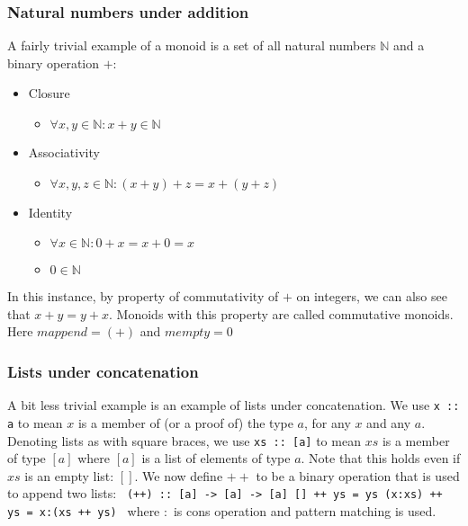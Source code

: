 \documentclass{acm_proc_article-sp}
\begin{document}
{\subsubsection{Natural numbers under addition}
A fairly trivial example of a monoid is a set of all natural numbers
$\mathbb{N}$ and a binary operation $+$:
\begin{itemize}
\item Closure
  \begin{itemize}
  \item $\forall x,y \in \mathbb{N} : x + y \in \mathbb{N}$
  \end{itemize}
\item Associativity
  \begin{itemize}
  \item $\forall x,y,z \in \mathbb{N} : (x + y) + z = x + (y + z)$
  \end{itemize}
\item Identity
  \begin{itemize}
  \item $\forall x \in \mathbb{N} : 0 + x = x + 0 = x$
  \item $0 \in \mathbb{N}$
  \end{itemize}
\end{itemize}
In this instance, by property of commutativity of $+$ on integers, we
can also see that $x + y = y + x$. Monoids with this property are
called commutative monoids. Here $mappend = (+)$ and $mempty = 0$

\subsubsection{Lists under concatenation}
A bit less trivial example is an example of lists under concatenation.
We use \texttt{x :: a} to mean $x$ is a member of (or a proof of) the
type $a$, for any $x$ and any $a$. Denoting lists as with square
braces, we use \texttt{xs :: [a]} to mean $xs$ is a member of type
$[a]$ where $[a]$ is a list of elements of type $a$. Note that this
holds even if $xs$ is an empty list: $[]$. We now define $++$ to be a
binary operation that is used to append two lists:
\texttt{
(++) :: [a] -> [a] -> [a]
[] ++ ys = ys
(x:xs) ++ ys = x:(xs ++ ys)
} where $:$ is cons operation and pattern matching is used.

}
\end{document}
